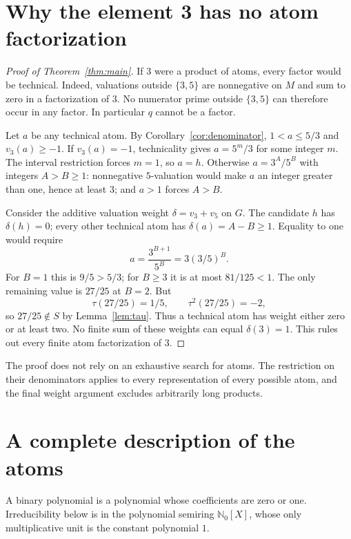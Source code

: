 \documentclass[11pt]{article}
\theoremstyle{definition}
\newcommand{\NN}{\mathbb N}
\begin{document}
\section{Why the element 3 has no atom factorization}
\begin{proof}[Proof of Theorem~\ref{thm:main}]
If $3$ were a product of atoms, every factor would be technical.
Indeed, valuations outside $\{3,5\}$ are nonnegative on $M$ and sum
to zero in a factorization of $3$. No numerator prime outside
$\{3,5\}$ can therefore occur in any factor. In particular $q$
cannot be a factor.

Let $a$ be any technical atom. By Corollary~\ref{cor:denominator},
$1<a\le5/3$ and $v_3(a)\ge-1$.
If $v_3(a)=-1$, technicality gives $a=5^m/3$ for some integer $m$.
The interval restriction forces $m=1$, so $a=h$.
Otherwise $a=3^A/5^B$ with integers $A>B\ge1$: nonnegative
$5$-valuation would make $a$ an integer greater than one, hence at
least $3$; and $a>1$ forces $A>B$.

Consider the additive valuation weight $\delta=v_3+v_5$ on $G$.
The candidate $h$ has $\delta(h)=0$; every other technical atom has
$\delta(a)=A-B\ge1$. Equality to one would require
\[
 a=\frac{3^{B+1}}{5^B}=3(3/5)^B.
\]
For $B=1$ this is $9/5>5/3$; for $B\ge3$ it is at most
$81/125<1$. The only remaining value is $27/25$ at $B=2$.
But
\[
 \tau(27/25)=1/5,\qquad \tau^2(27/25)=-2,
\]
so $27/25\notin S$ by Lemma~\ref{lem:tau}.
Thus a technical atom has weight either zero or at least two.
No finite sum of these weights can equal $\delta(3)=1$.
This rules out every finite atom factorization of $3$.
\end{proof}

The proof does not rely on an exhaustive search for atoms. The restriction
on their denominators applies to every representation of every possible
atom, and the final weight argument excludes arbitrarily long products.

\section{A complete description of the atoms}
A binary polynomial is a polynomial whose coefficients are zero or one.
Irreducibility below is in the polynomial semiring $\NN_0[X]$, whose
only multiplicative unit is the constant polynomial $1$.
\end{document}
